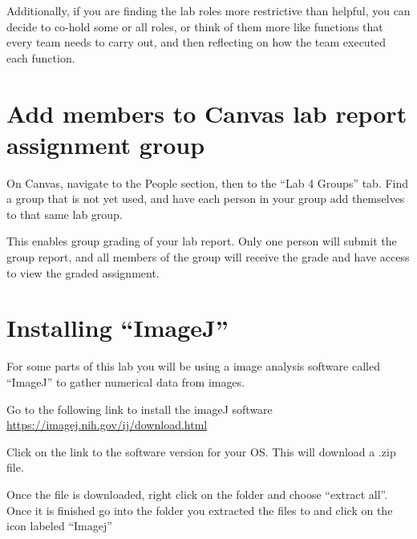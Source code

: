 Additionally, if you are finding the lab roles more restrictive than helpful, you can decide to co-hold some or all roles, or think of them more like functions that every team needs to carry out, and then reflecting on how the team executed each function.

\section{Add members to Canvas lab report assignment group}

\begin{steps}
	\item On Canvas, navigate to the People section, then to the ``Lab 4 Groups'' tab. Find a group that is not yet used, and have each person in your group add themselves to that same lab group.
\end{steps}

This enables group grading of your lab report. Only one person will submit the group report, and all members of the group will receive the grade and have access to view the graded assignment.

\section{Installing ``ImageJ''}
For some parts of this lab you will be using a image analysis software called ``ImageJ'' to gather numerical data from images.
\begin{steps}
	\item Go to the following link to install the imageJ software \url{https://imagej.nih.gov/ij/download.html}
	\item Click on the link to the software version for your OS. This will download a .zip file.
	\item Once the file is downloaded, right click on the folder and choose ``extract all''. Once it is finished go into the folder you extracted the files to and click on the icon labeled ``Imagej''
\end{steps}



